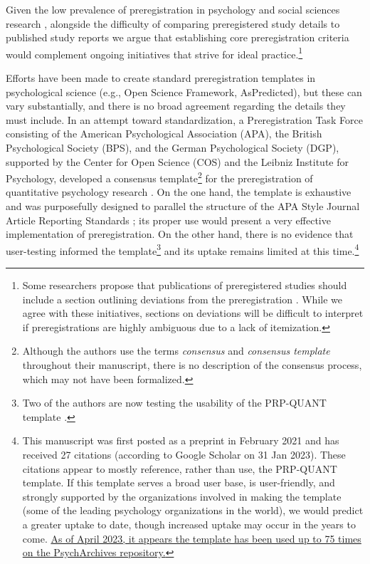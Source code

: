 \documentclass[authordate, meta, issue]{jote-new-article}
\begin{document}
Given the low prevalence of preregistration in psychology and social sciences research \parencites{Hardwicke2020}{Hardwicke2021}{Scoggins2023}, alongside the difficulty of comparing preregistered study details to published study reports \parencites{TARG2022}{vandenAkker2022} we argue that establishing core preregistration criteria would complement ongoing initiatives that strive for ideal practice.\footnote{Some researchers propose that publications of preregistered studies should include a section outlining deviations from the preregistration \parencites[e.g.,][]{Campbell2019}. While we agree with these initiatives, sections on deviations will be difficult to interpret if preregistrations are highly ambiguous due to a lack of itemization. }







Efforts have been made to create standard preregistration templates in psychological science (e.g., Open Science Framework, AsPredicted), but these can vary substantially, and there is no broad agreement regarding the details they must include. In an attempt toward standardization, a Preregistration Task Force consisting of the American Psychological Association (APA), the British Psychological Society (BPS), and the German Psychological Society (DGP), supported by the Center for Open Science (COS) and the Leibniz Institute for Psychology, developed a consensus template\footnote{Although the authors use the terms \emph{consensus }and \emph{consensus template} throughout their manuscript, there is no description of the consensus process, which may not have been formalized.} for the preregistration of quantitative psychology research \parencites[the PRP-QUANT template;][]{Bosnjak2022}. On the one hand, the template is exhaustive and was purposefully designed to parallel the structure of the APA Style Journal Article Reporting Standards \parencites{Appelbaum2018}; its proper use would present a very effective implementation of preregistration. On the other hand, there is no evidence that user-testing informed the template\footnote{ Two of the authors are now testing the usability of the PRP-QUANT template \parencites[preregistration:][]{Spitzer2021}.} and its uptake remains limited at this time.\footnote{ This manuscript was first posted as a preprint in February 2021 and has received 27 citations (according to Google Scholar on 31 Jan 2023). These citations appear to mostly reference, rather than use, the PRP-QUANT template. If this template serves a broad user base, is user-friendly, and strongly supported by the organizations involved in making the template (some of the leading psychology organizations in the world), we would predict a greater uptake to date, though increased uptake may occur in the years to come. \href{https://www.psycharchives.org/en/browse/?q=zpid.tags.visible\%3APRP-QUANT}{As of April 2023, it appears the template has been used up to 75 times on the PsychArchives repository.} }
\end{document}
